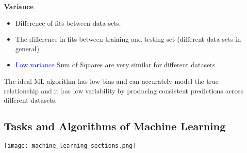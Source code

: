 \textbf{Variance}
\begin{itemize}
    \item Difference of fits between data sets.\\
    \item The difference in fits between training and testing set (different data sets in general)
    \item \textcolor{blue}{Low variance} Sum of Squares are very similar for different datasets
\end{itemize}
The ideal ML algorithm has low bias and can accurately model the true relationship and it has low variability by producing consistent predictions across different datasets.

\subsection{Tasks and Algorithms of Machine Learning}
\texttt{[image: machine\_learning\_sections.png]}

